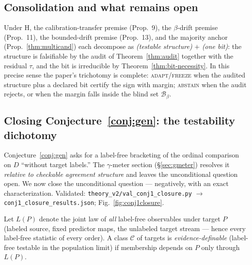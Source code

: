 \subsection{Consolidation and what remains open}\label{sec:consolidation}

\begin{corollary}\label{cor:unify-budgets}
Under H, the calibration-transfer premise (Prop.~9), the $\beta$-drift premise
(Prop.~11), the bounded-drift premise (Prop.~13), and the majority anchor
(Prop.~\ref{thm:multicand}) each decompose as
\emph{(testable structure)} $+$ \emph{(one bit)}: the structure is falsifiable by the
audit of Theorem~\ref{thm:audit} together with the residual $\tau$, and the bit is
irreducible by Theorem~\ref{thm:bit-necessity}. In this precise sense the paper's
trichotomy is complete: \textsc{adapt}/\textsc{freeze} when the audited structure plus a
declared bit certify the sign with margin; \textsc{abstain} when the audit rejects, or
when the margin falls inside the blind set $\mathcal B_\beta$.
\end{corollary}

\subsection{Closing Conjecture~\ref{conj:gen}: the testability dichotomy}\label{sec:conj1-closure}

Conjecture~\ref{conj:gen} asks for a label-free bracketing of the ordinal comparison on
$D$ ``without target labels.'' The $\gamma$-meter section (\S\ref{sec:gmeter}) resolves
it \emph{relative to checkable agreement structure} and leaves the unconditional
question open. We now close the unconditional question --- negatively, with an exact
characterization. Validated: \texttt{theory\_v2/val\_conj1\_closure.py} $\to$
\texttt{conj1\_closure\_results.json}; Fig.~\ref{fig:conj1closure}.

\begin{definition}\label{def:evdef}
Let $L(P)$ denote the joint law of \emph{all} label-free observables under target $P$
(labeled source, fixed predictor maps, the unlabeled target stream --- hence every
label-free statistic of every order). A class $\mathcal C$ of targets is
\emph{evidence-definable} (label-free testable in the population limit) if membership
depends on $P$ only through $L(P)$.
\end{definition}

